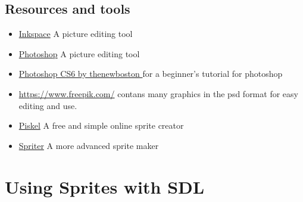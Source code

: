 \documentclass[11pt,fleqn]{book} %
\begin{document}
    \section{Resources and tools}
    \begin{itemize}
    
        \item \color{blue} \href{https://inkscape.org/en/release/0.92.3/}{Inkspace} \color{black} A picture editing tool
        \item \color{blue} \href{https://www.adobe.com/products/photoshop.html}{Photoshop} \color{black} A picture editing tool
        \item \color{blue} \href{https://www.youtube.com/watch?v=givuYd_cKm0&list=PL6gx4Cwl9DGD25IGk9Xf7oC3wiT9gC75x}{Photoshop CS6 by thenewboston
} \color{black} for a beginner's tutorial for photoshop
    	\item \color{blue} \href{https://www.freepik.com/}{https://www.freepik.com/} \color{black} contans many graphics in the psd format for easy editing and use.
        \item \color{blue} \href{https://www.piskelapp.com/}{Piskel} \color{black} A free and simple online sprite creator
        \item \color{blue} \href{https://brashmonkey.com/}{Spriter} \color{black} A more advanced sprite maker

    \end{itemize}
    
    

\chapter{Using Sprites with SDL} %
\end{document}
